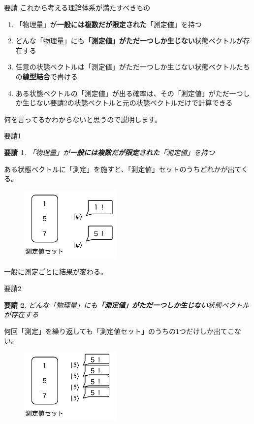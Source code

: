 \documentclass[dvipdfm]{beamer}
\newtheorem*{requirement}{要請}
\begin{document}
\begin{frame}{要請}
    これから考える理論体系が満たすべきもの
    \begin{enumerate}
        \item 「物理量」が\textbf{一般には複数だが限定された}「測定値」を持つ
        \item どんな「物理量」にも\textbf{「測定値」がただ一つしか生じない}状態ベクトルが存在する
        \item 任意の状態ベクトルは「測定値」がただ一つしか生じない状態ベクトルたちの\textbf{線型結合}で書ける
        \item ある状態ベクトルの「測定値」が出る確率は、その「測定値」がただ一つしか生じない要請2の状態ベクトルと元の状態ベクトルだけで計算できる
    \end{enumerate}
    何を言ってるかわからないと思うので説明します。
\end{frame}

\begin{frame}{要請1}
    \begin{requirement}
        「物理量」が\textbf{一般には複数だが限定された}「測定値」を持つ
    \end{requirement}
    ある状態ベクトルに「測定」を施すと、「測定値」セットのうちどれかが出てくる。
    \begin{figure}
        \centering
        \includegraphics[width=5cm]{measurement.png}
    \end{figure}
    一般に測定ごとに結果が変わる。
\end{frame}

\begin{frame}{要請2}
    \begin{requirement}
        どんな「物理量」にも\textbf{「測定値」がただ一つしか生じない}状態ベクトルが存在する
    \end{requirement}
    何回「測定」を繰り返しても「測定値セット」のうちの1つだけしか出てこない。
    \begin{figure}
        \centering
        \includegraphics[width=5cm]{eigenmeasurement.png}
    \end{figure}
\end{frame}
\end{document}
